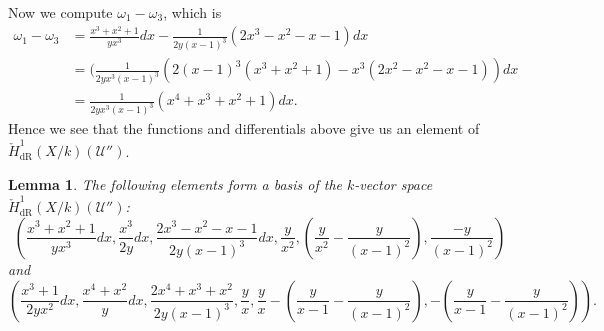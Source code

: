 \documentclass[draft, 11pt]{article} %
\theoremstyle{plain}
\newtheorem{lem}[defn]{Lemma}
\theoremstyle{remark}
\newcommand{\cU}{{\mathcal U}}
\newcommand{\cechderhamhone}{\check{H}_{\text {dR}}^1(X/k)}
\begin{document}
Now we compute $\omega_1 - \omega_3$, which is
\begin{align*}
\omega_1 - \omega_3 & = \frac{x^3 + x^2 + 1}{yx^3}dx -  \frac{1}{2y(x-1)^3}(2x^3-x^2-x-1)dx \\
& = (\frac{1}{2yx^3(x-1)^3} (2(x-1)^3(x^3 + x^2 + 1) - x^3(2x^2 - x^2 - x - 1)) dx \\
& = \frac{1}{2yx^3(x-1)^3} (x^4 + x^3 + x^2 + 1) dx.
\end{align*}
Hence we see that the functions and differentials above give us an element of $\cechderhamhone(\cU '')$.

\pagebreak

\begin{lem}
The following elements form a basis of the $k$-vector space $\cechderhamhone(\cU '')$:
\begin{equation}\label{basis1}
\left(  \frac{x^3 + x^2 + 1}{yx^3}dx, \frac{x^3}{2y}dx, \frac{2x^3 - x^2 - x -1 }{2y(x-1)^3} dx, \frac{y}{x^2}, \left(\frac{y}{x^2} - \frac{y}{(x-1)^2} \right) , \frac{-y}{(x-1)^2} \right)
\end{equation}
and 
\begin{equation}\label{basis2}
\left( \frac{x^3+1}{2yx^2}dx, \frac{x^4+x^2}{y}dx, \frac{2x^4 + x^3 + x^2}{2y(x-1)^3}, \frac{y}{x}, \frac{y}{x} - \left(\frac{y}{x-1} - \frac{y}{(x-1)^2} \right), - \left( \frac{y}{x-1} - \frac{y}{(x-1)^2} \right)\right).
\end{equation}
\end{lem}
\end{document}
